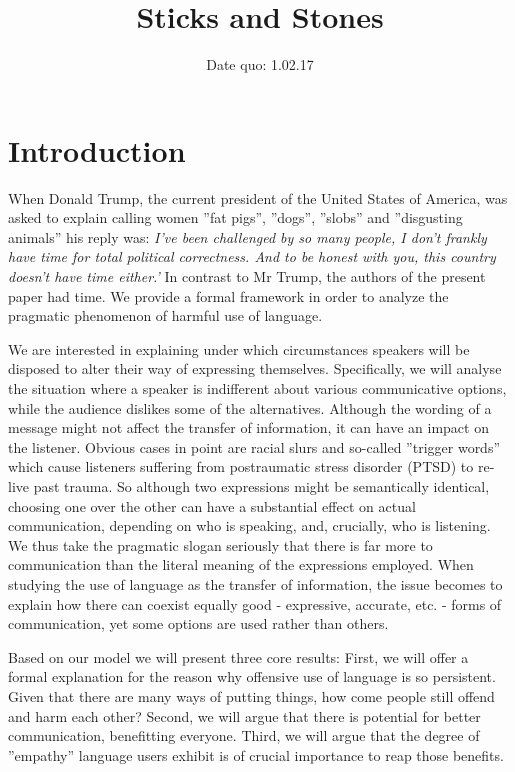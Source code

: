 \documentclass[10]{article}
\title{Sticks and Stones}
\date{Date quo: 1.02.17}
\begin{document}
\maketitle

\section{Introduction}
When Donald Trump, the current president of the United States of America, was asked to explain calling women ''fat pigs'', ''dogs'', ''slobs'' and ''disgusting animals'' his reply was:
\textit{I’ve been challenged by so many people, I don’t frankly have time for total political correctness. And to be honest with you, this country doesn’t have time either.'}
In contrast to Mr Trump, the authors of the present paper had time. We provide a formal framework in order to analyze the pragmatic phenomenon of harmful use of language.

We are interested in explaining under which circumstances speakers will be disposed to alter their way of expressing themselves. Specifically, we will analyse the situation where a speaker is indifferent about various communicative options, while the audience dislikes some of the alternatives. Although the wording of a message might not affect the transfer of information, it can have an impact on the listener. Obvious cases in point are racial slurs and so-called ''trigger words'' which cause listeners suffering from postraumatic stress disorder (PTSD) to re-live past trauma. \cite{fagan2004confronting, yehuda2002post} So although two expressions might be semantically identical, choosing one over the other can have a substantial effect on actual communication, depending on who is speaking, and, crucially, who is listening. We thus take the pragmatic slogan seriously that there is far more to communication than the literal meaning of the expressions employed.
When studying the use of language as the transfer of information, the issue becomes to explain how there can coexist equally good - expressive, accurate, etc. - forms of communication, yet some options are used rather than others.

Based on our model we will present three core results: First, we will offer a formal explanation for the reason why offensive use of language is so persistent. Given that there are many ways of putting things, how come people still offend and harm each other?  Second, we will argue that there is potential for better communication, benefitting everyone. Third, we will argue that the degree of ''empathy'' language users exhibit is of crucial importance to reap those benefits.
\end{document}
